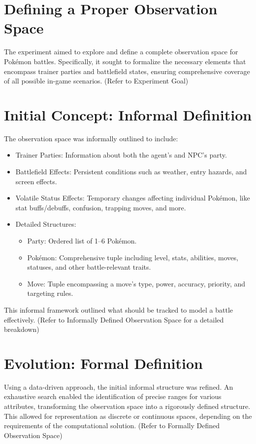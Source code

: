 \section{Defining a Proper Observation Space}

The experiment aimed to explore and define a complete observation space for Pokémon battles. Specifically, it sought to formalize the necessary elements that encompass trainer parties and battlefield states, ensuring comprehensive coverage of all possible in-game scenarios. (Refer to Experiment Goal)

\section{Initial Concept: Informal Definition}

The observation space was informally outlined to include:
\begin{itemize}
    \item Trainer Parties: Information about both the agent's and NPC's party.
    \item Battlefield Effects: Persistent conditions such as weather, entry hazards, and screen effects.
    \item Volatile Status Effects: Temporary changes affecting individual Pokémon, like stat buffs/debuffs, confusion, trapping moves, and more.
    \item Detailed Structures:
    \begin{itemize}
        \item Party: Ordered list of 1–6 Pokémon.
        \item Pokémon: Comprehensive tuple including level, stats, abilities, moves, statuses, and other battle-relevant traits.
        \item Move: Tuple encompassing a move’s type, power, accuracy, priority, and targeting rules.
    \end{itemize}
\end{itemize}

This informal framework outlined what should be tracked to model a battle effectively. (Refer to Informally Defined Observation Space for a detailed breakdown)

\section{Evolution: Formal Definition}

Using a data-driven approach, the initial informal structure was refined. An exhaustive search enabled the identification of precise ranges for various attributes, transforming the observation space into a rigorously defined structure. This allowed for representation as discrete or continuous spaces, depending on the requirements of the computational solution. (Refer to Formally Defined Observation Space)


